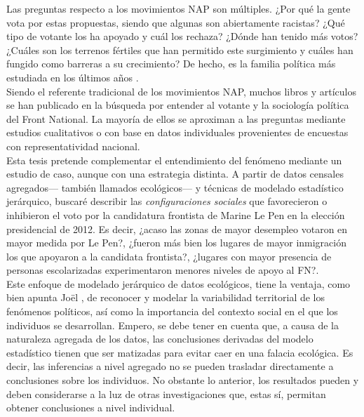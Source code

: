 Las preguntas respecto a los movimientos NAP son múltiples. ¿Por qué la gente vota por estas propuestas, siendo que algunas son abiertamente racistas? ¿Qué tipo de votante los ha apoyado y cuál los rechaza? ¿Dónde han tenido más votos? ¿Cuáles son los terrenos fértiles que han permitido este surgimiento y cuáles han fungido como barreras a su crecimiento? De hecho, es la familia política más estudiada en los últimos años \parencite{Mudde16}.\\ 

Siendo el referente tradicional de los movimientos NAP, muchos libros y artículos se han publicado en la búsqueda por entender al votante y la sociología política del Front National. La mayoría de ellos se aproximan a las preguntas mediante estudios cualitativos o con base en datos individuales provenientes de encuestas con representatividad nacional.\\ 

Esta tesis pretende complementar el entendimiento del fenómeno mediante un estudio de caso, aunque con una estrategia distinta. A partir de datos censales agregados--- también llamados ecológicos--- y técnicas de modelado estadístico jerárquico, buscaré describir las \textit{configuraciones sociales} que favorecieron o inhibieron el voto por la candidatura frontista de Marine Le Pen en la elección presidencial de 2012. Es decir, ¿acaso las zonas de mayor desempleo votaron en mayor medida por Le Pen?, ¿fueron más bien los lugares de mayor inmigración los que apoyaron a la candidata frontista?, ¿lugares con mayor presencia de personas escolarizadas experimentaron menores niveles de apoyo al FN?.\\

Este enfoque de modelado jerárquico de datos ecológicos, tiene la ventaja, como bien apunta Joël \textcite{Gombin05}, de reconocer y modelar la variabilidad territorial de los fenómenos políticos, así como la importancia del contexto social en el que los individuos se desarrollan. Empero, se debe tener en cuenta que, a causa de la naturaleza agregada de los datos, las conclusiones derivadas del modelo estadístico tienen que ser matizadas para evitar caer en una falacia ecológica. Es decir, las inferencias a nivel agregado no se pueden trasladar directamente a conclusiones sobre los individuos. No obstante lo anterior, los resultados pueden y deben considerarse a la luz de otras investigaciones que, estas sí, permitan obtener conclusiones a nivel individual.\\ 

